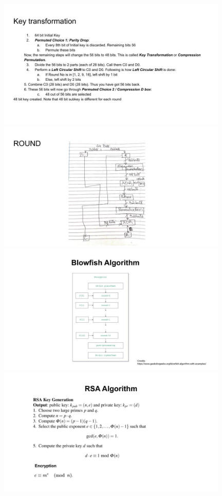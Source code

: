\documentclass[a4paper]{beamer}
\begin{document}
\includegraphics[width=11cm]{images/Prez_5.jpg}
\includegraphics[width=11cm]{images/Prez_6.jpg}
\includegraphics[width=11cm]{images/Prez_7.jpg}
\includegraphics[width=11cm]{images/Prez_8.jpg}
\end{document}
